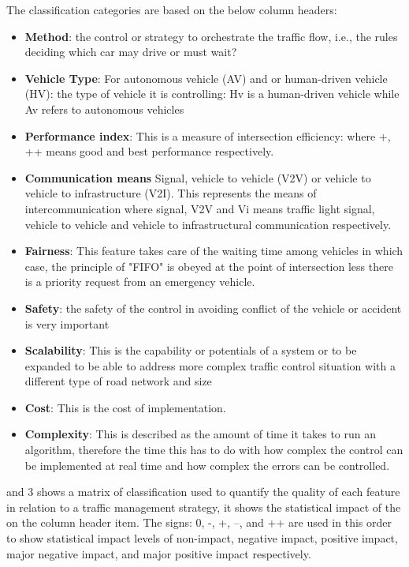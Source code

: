 \documentclass{book}
\begin{document}
The classification categories are based on the below column headers:

\begin{itemize}
	\item \textbf{Method}: the control  or strategy to orchestrate the traffic flow, i.e., the rules deciding which car may drive or must wait?

	\item \textbf{Vehicle Type}: For autonomous vehicle (AV) and or human-driven vehicle (HV): the type of vehicle it  is controlling: Hv is a human-driven vehicle while Av refers to autonomous vehicles
	\item \textbf{Performance index}: This is a measure of intersection efficiency: where +, ++ means good and best performance respectively.
	\item \textbf{Communication means} Signal, vehicle to vehicle (V2V) or vehicle to vehicle to infrastructure (V2I). This represents the means of intercommunication where signal, V2V and Vi means traffic light signal, vehicle to vehicle and vehicle to infrastructural communication respectively.
	\item \textbf{Fairness}: This feature takes care of the waiting time among vehicles in which case, the principle of "FIFO" is obeyed at the point of intersection less there is a priority request from an emergency vehicle.
	\item \textbf{Safety}: the safety of the control in avoiding conflict of the vehicle or  accident is very important
	\item \textbf{Scalability}: This is the capability or potentials of a system or  to be expanded to be able to address more complex traffic control situation with a different type of road network and size
	\item \textbf{Cost}: This is the cost of implementation.
	\item \textbf{Complexity}: This is described as the amount of time it takes to run an algorithm, therefore the time this has to do with how complex the control  can be implemented at real time  and how complex the errors can be controlled.

\end{itemize}
 and 3  shows a matrix of classification used to quantify the quality of each feature in relation to a traffic management strategy, it shows the statistical impact of the  on the column header item. The signs: {0}, {-}, {+}, {--}, and {++} are used in this order to show statistical impact levels of non-impact, negative impact, positive impact, major negative impact, and major positive impact respectively.
\end{document}
